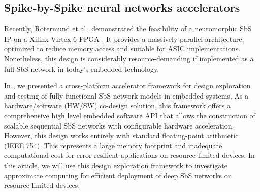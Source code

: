 \subsection{Spike-by-Spike neural networks accelerators}
Recently, Rotermund et al.\ demonstrated the feasibility of a neuromorphic SbS IP on a Xilinx Virtex 6 FPGA \cite{rotermund2018massively}. It provides a massively parallel architecture, optimized to reduce memory access and suitable for ASIC implementations. Nonetheless, this design is considerably resource-demanding if implemented as a full SbS network in today's embedded technology.

In , we presented a cross-platform accelerator framework for design exploration and testing of fully functional SbS network models in embedded systems. As a hardware/software (HW/SW) co-design solution, this framework offers a comprehensive high level embedded software API that allows the construction of scalable sequential SbS networks with configurable hardware acceleration.
\REVIEW
{However, this design works entirely with standard floating-point arithmetic (IEEE 754). This represents a large memory footprint and inadequate computational cost for error resilient applications on resource-limited devices.
}
 In this article, we will use this design exploration framework to investigate approximate computing for efficient deployment of deep SbS networks on resource-limited devices.
